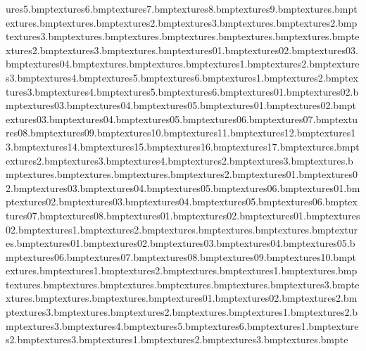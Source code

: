 ures\elechut5.bmp textures\elechut6.bmp textures\elechut7.bmp textures\elechut8.bmp textures\elechut9.bmp textures\elecloop.bmp textures\fblu.bmp textures\fence.bmp textures\fence2.bmp textures\fence3.bmp textures\fencesnow.bmp textures\fencesnow2.bmp textures\fencesnow3.bmp textures\fgre.bmp textures\flash.bmp textures\fpurp.bmp textures\fred.bmp textures\fries.bmp textures\fries2.bmp textures\fries3.bmp textures\gate.bmp textures\gen01.bmp textures\gen02.bmp textures\gen03.bmp textures\gen04.bmp textures\grass.bmp textures\grasscracks.bmp textures\grassedge1.bmp textures\grassedge2.bmp textures\grassedge3.bmp textures\grassedge4.bmp textures\grassedge5.bmp textures\grassedge6.bmp textures\grassshad1.bmp textures\grassshad2.bmp textures\grassshad3.bmp textures\grassshad4.bmp textures\grassshad5.bmp textures\grassshad6.bmp textures\grasstocobble01.bmp textures\grasstocobble02.bmp textures\grasstocobble03.bmp textures\grasstocobble04.bmp textures\grasstocobble05.bmp textures\grasstosand01.bmp textures\grasstosand02.bmp textures\grasstosand03.bmp textures\grasstosand04.bmp textures\grasstosand05.bmp textures\grasstosand06.bmp textures\grasstosand07.bmp textures\grasstosand08.bmp textures\grasstosand09.bmp textures\grasstosand10.bmp textures\grasstosand11.bmp textures\grasstosand12.bmp textures\grasstosand13.bmp textures\grasstosand14.bmp textures\grasstosand15.bmp textures\grasstosand16.bmp textures\grasstosand17.bmp textures\hamper.bmp textures\hamper2.bmp textures\hamper3.bmp textures\hamper4.bmp textures\hampfod2.bmp textures\hampfod3.bmp textures\hampfood.bmp textures\hamplid.bmp textures\hotdog.bmp textures\housefloor.bmp textures\housefloor2.bmp textures\hubflowers01.bmp textures\hubflowers02.bmp textures\hubflowers03.bmp textures\hubflowers04.bmp textures\hubflowers05.bmp textures\hubflowers06.bmp textures\hubpath01.bmp textures\hubpath02.bmp textures\hubpath03.bmp textures\hubpath04.bmp textures\hubpath05.bmp textures\hubpath06.bmp textures\hubpath07.bmp textures\hubpath08.bmp textures\hubpathbrick01.bmp textures\hubpathbrick02.bmp textures\hubpathcorner01.bmp textures\hubpathcorner02.bmp textures\hutbrick1.bmp textures\hutbrick2.bmp textures\hutcabtowel.bmp textures\hutceiling.bmp textures\hutcooker.bmp textures\hutfloor.bmp textures\hutfood01.bmp textures\hutfood02.bmp textures\hutfood03.bmp textures\hutfood04.bmp textures\hutfood05.bmp textures\hutfood06.bmp textures\hutfood07.bmp textures\hutfood08.bmp textures\hutfood09.bmp textures\hutfood10.bmp textures\hutsign.bmp textures\hutsink1.bmp textures\hutsink2.bmp textures\hutstripes.bmp textures\hutstripes1.bmp textures\hutstripesbar.bmp textures\hutwall.bmp textures\hutwallcolours.bmp textures\hutwallpans.bmp textures\hutwallplates.bmp textures\hutwallspice.bmp textures\tazsign3.bmp textures\hutworkbrush.bmp textures\hutworkcorner.bmp textures\hutworks.bmp textures\icecream01.bmp textures\icecream02.bmp textures\iceloll2.bmp textures\iceloll3.bmp textures\icelolly.bmp textures\icewafe2.bmp textures\icewafer.bmp textures\icewall1.bmp textures\icewall2.bmp textures\icewall3.bmp textures\icewall4.bmp textures\icewall5.bmp textures\icewall6.bmp textures\icewallex1.bmp textures\icewallex2.bmp textures\icewallex3.bmp textures\icewallexshine1.bmp textures\icewallexshine2.bmp textures\icewallexshine3.bmp textures\jhut.bmp te